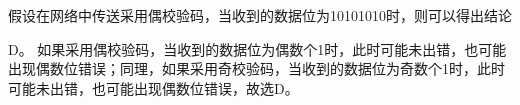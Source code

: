 \question 假设在网络中传送采用偶校验码，当收到的数据位为10101010时，则可以得出结论
\par{}
\begin{solution}D。
如果采用偶校验码，当收到的数据位为偶数个1时，此时可能未出错，也可能出现偶数位错误；同理，如果采用奇校验码，当收到的数据位为奇数个1时，此时可能未出错，也可能出现偶数位错误，故选D。
\end{solution}
